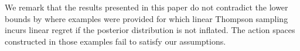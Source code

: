 We remark that the results presented in this paper do not contradict the lower bounds by \citet{hamidi2020worst,zhang2021feel} where examples were provided for which linear Thompson sampling incurs linear regret if the posterior distribution is not inflated. The action spaces constructed in those examples fail to satisfy our assumptions.






